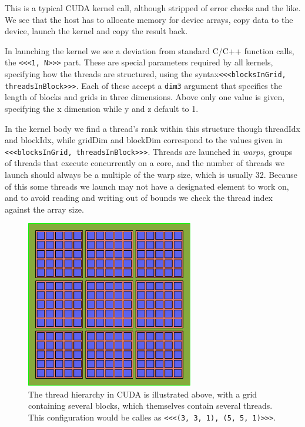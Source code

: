 This is a typical CUDA kernel call, although stripped of error checks and the like. We see that the host has to allocate
memory for device arrays, copy data to the device, launch the kernel and copy the result back.

In launching the kernel we see a deviation from standard C/C++ function calls, the \lstinline{<<<1, N>>>} part. These
are special parameters required by all kernels, specifying how the threads are structured, using the syntax\lstinline{<<<blocksInGrid, threadsInBlock>>>}.
Each of these accept a \lstinline{dim3} argument that specifies the length of blocks and grids in three dimensions.
Above only one value is given, specifying the x dimension while y and z default to 1.

In the kernel body we find a thread's rank within this structure though threadIdx and blockIdx, while gridDim and blockDim
correspond to the values given in \lstinline{<<<blocksInGrid, threadsInBlock>>>}. Threads are launched in \emph{warps},
groups of threads that execute concurrently on a core, and the number of threads we launch should always be a multiple
of the warp size, which is usually 32. Because of this some threads we launch may not have a designated element to work
on, and to avoid reading and writing out of bounds we check the thread index against the array size.

\begin{figure}[!htbp]
	\centering
	\includegraphics[width=0.65\textwidth]{figure/threads}
	\caption[Hierarchical structure of threads.]{The thread hierarchy in CUDA is illustrated above, with a grid containing several blocks, which themselves contain several threads.
	This configuration would be calles as \lstinline{<<<(3, 3, 1), (5, 5, 1)>>>}.}
	\label{fig:thread-hierarchy}
\end{figure}

